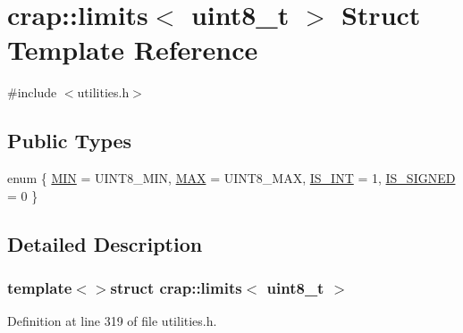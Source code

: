 \hypertarget{structcrap_1_1limits_3_01uint8__t_01_4}{\section{crap\+:\+:limits$<$ uint8\+\_\+t $>$ Struct Template Reference}
\label{structcrap_1_1limits_3_01uint8__t_01_4}
}


{\ttfamily \#include $<$utilities.\+h$>$}

\subsection*{Public Types}
\begin{DoxyCompactItemize}
\item 
enum \{ \hyperlink{structcrap_1_1limits_3_01uint8__t_01_4_a5c80c88cc9afd5b367011756d3b53defa4a83b22dae2ce09dd72bf5cb29687118}{M\+I\+N} = U\+I\+N\+T8\+\_\+\+M\+I\+N, 
\hyperlink{structcrap_1_1limits_3_01uint8__t_01_4_a5c80c88cc9afd5b367011756d3b53defa782ec620bbe79358c648f5a6784338f2}{M\+A\+X} = U\+I\+N\+T8\+\_\+\+M\+A\+X, 
\hyperlink{structcrap_1_1limits_3_01uint8__t_01_4_a5c80c88cc9afd5b367011756d3b53defab6923c8e2e67eb18afa6948d4af638a3}{I\+S\+\_\+\+I\+N\+T} = 1, 
\hyperlink{structcrap_1_1limits_3_01uint8__t_01_4_a5c80c88cc9afd5b367011756d3b53defa31ea108f27c14dd7936d14e0bbfaf293}{I\+S\+\_\+\+S\+I\+G\+N\+E\+D} = 0
 \}
\end{DoxyCompactItemize}


\subsection{Detailed Description}
\subsubsection*{template$<$$>$struct crap\+::limits$<$ uint8\+\_\+t $>$}



Definition at line 319 of file utilities.\+h.



